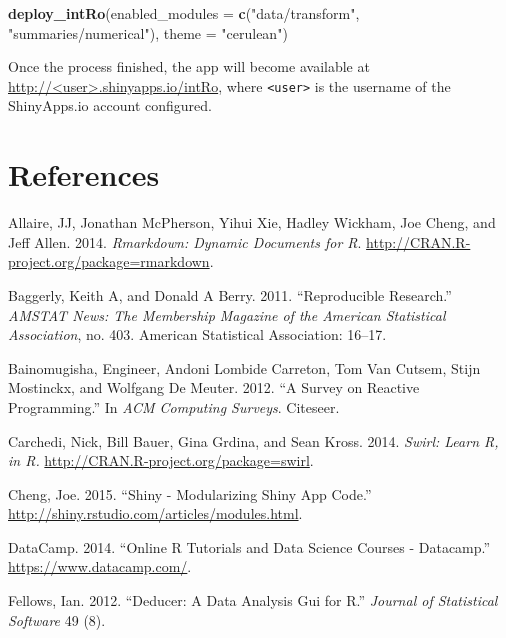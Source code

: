 \documentclass[12pt,]{article}
\newenvironment{Shaded}{\begin{snugshade}}{\end{snugshade}}
\newcommand{\KeywordTok}[1]{\textcolor[rgb]{0.13,0.29,0.53}{\textbf{{#1}}}}
\newcommand{\DataTypeTok}[1]{\textcolor[rgb]{0.13,0.29,0.53}{{#1}}}
\newcommand{\StringTok}[1]{\textcolor[rgb]{0.31,0.60,0.02}{{#1}}}
\newcommand{\NormalTok}[1]{{#1}}
\begin{document}
\begin{Shaded}
\begin{Highlighting}[]
\KeywordTok{deploy_intRo}\NormalTok{(}\DataTypeTok{enabled_modules =} \KeywordTok{c}\NormalTok{(}\StringTok{"data/transform"}\NormalTok{, }\StringTok{"summaries/numerical"}\NormalTok{), }
             \DataTypeTok{theme =} \StringTok{"cerulean"}\NormalTok{)}
\end{Highlighting}
\end{Shaded}

Once the process finished, the app will become available at
\url{http://<user>.shinyapps.io/intRo}, where
\texttt{\textless{}user\textgreater{}} is the username of the
ShinyApps.io account configured.

\section*{References}\label{references}

\hypertarget{refs}{}
\hypertarget{ref-rmarkdown}{}
Allaire, JJ, Jonathan McPherson, Yihui Xie, Hadley Wickham, Joe Cheng,
and Jeff Allen. 2014. \emph{Rmarkdown: Dynamic Documents for R}.
\url{http://CRAN.R-project.org/package=rmarkdown}.

\hypertarget{ref-baggerly2011reproducible}{}
Baggerly, Keith A, and Donald A Berry. 2011. ``Reproducible Research.''
\emph{AMSTAT News: The Membership Magazine of the American Statistical
Association}, no. 403. American Statistical Association: 16--17.

\hypertarget{ref-bainomugisha2012survey}{}
Bainomugisha, Engineer, Andoni Lombide Carreton, Tom Van Cutsem, Stijn
Mostinckx, and Wolfgang De Meuter. 2012. ``A Survey on Reactive
Programming.'' In \emph{ACM Computing Surveys}. Citeseer.

\hypertarget{ref-swirl}{}
Carchedi, Nick, Bill Bauer, Gina Grdina, and Sean Kross. 2014.
\emph{Swirl: Learn R, in R.}
\url{http://CRAN.R-project.org/package=swirl}.

\hypertarget{ref-shinymodules}{}
Cheng, Joe. 2015. ``Shiny - Modularizing Shiny App Code.''
\url{http://shiny.rstudio.com/articles/modules.html}.

\hypertarget{ref-datacamp}{}
DataCamp. 2014. ``Online R Tutorials and Data Science Courses -
Datacamp.'' \url{https://www.datacamp.com/}.

\hypertarget{ref-fellows2012}{}
Fellows, Ian. 2012. ``Deducer: A Data Analysis Gui for R.''
\emph{Journal of Statistical Software} 49 (8).
\end{document}

